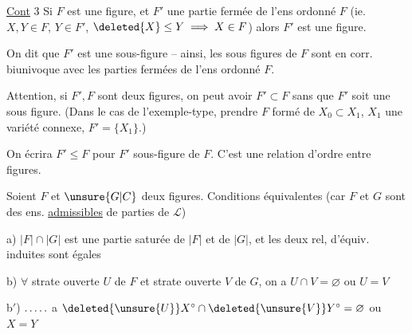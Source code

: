  


\uline{Cont} 3 Si $F$ est une  figure, et $F'$ une partie fermée de l'ens ordonné $F$ (ie. $X,Y\in F$, $Y\in F'$, $\deleted{X}\leq Y\implies X\in F$) alors $F'$ est une figure.

On dit que $F'$ est une sous-figure -- ainsi, les sous figures de $F$ sont en corr. biunivoque avec les parties fermées de l'ens ordonné $F$.

Attention, si $F',F$ sont deux figures, on peut avoir $F'\subset F$ sans que $F'$ soit une sous figure. (Dans le cas de l'exemple-type, prendre $F$ formé de $X_0\subset X_1$, $X_1$ une variété connexe, $F'=\{X_1\}$.)


On écrira \deleted{$\unsure{\leq|\subset}$} $F'\leq F$ pour $F'$ sous-figure de $F$. C'est une relation d'ordre entre figures.


Soient $F$ et $\unsure{G|C}$ deux figures. Conditions équivalentes (car $F$ et $G$ sont des ens. \uline{admissibles} de parties de $\mathcal{L}$)

a) $|F|\cap|G|$ est une partie saturée de $|F|$ et de $|G|$, et les deux rel, d'équiv. induites sont égales


b) $\forall$ strate ouverte $U$ de $F$ et strate ouverte $V$ de $G$, on a $U\cap V=\varnothing$ ou $U=V$

b$'$) $\ldotp\ldotp\ldotp\ldotp\ldotp$  a $\deleted{\unsure{U}}X^\circ\cap\deleted{\unsure{V}}Y^\circ=\varnothing$ ou $X=Y$

